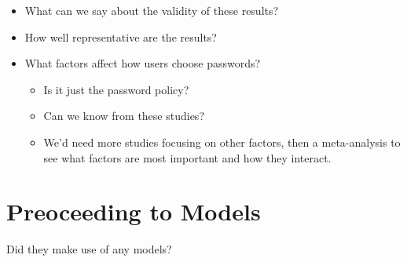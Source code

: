 \begin{frame}
  \begin{question}
    \begin{itemize}
      \item What can we say about the validity of these results?
    \end{itemize}
  \end{question}

  \begin{question}
    \begin{itemize}
      \item How well representative are the results?
    \end{itemize}
  \end{question}
\end{frame}

\begin{frame}
  \begin{question}
    \begin{itemize}
      \item What factors affect how users choose passwords?
        \begin{itemize}
          \item Is it just the password policy?
          \item Can we know from these studies?
          \item We'd need more studies focusing on other factors, then a meta-analysis to see what factors are most important and how they interact.
        \end{itemize}
    \end{itemize}
  \end{question}
\end{frame}

\section{Preoceeding to Models}

\begin{frame}
  \begin{question}
    Did they make use of any models?
  \end{question}
\end{frame}

